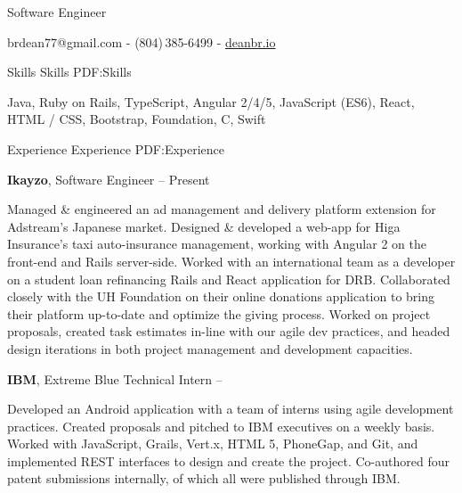 \documentclass[letterpaper,MMMyyyy,nonstopmode]{simpleresumecv}
\newcommand{\CVWebpage}{deanbr.io}
\begin{document}


\begin{SubTitle}
{Software Engineer}
\par
{brdean77@gmail.com}
-
(804)\,385-6499
-
{\url{\CVWebpage}}
\end{SubTitle}

\begin{Body}


\Section
{Skills}
{Skills}
{PDF:Skills}

\begin{large}
\Entry
Java,
Ruby on Rails,
TypeScript,
Angular 2/4/5,
JavaScript (ES6),
React,
HTML / CSS,
\Gap
Bootstrap,
Foundation,
C,
Swift
\end{large}



\BigGap
\Section
{Experience}
{Experience}
{PDF:Experience}

\Entry
\begin{large}
{\textbf{Ikayzo}},
Software Engineer
\hfill
{} --
Present

\Gap
\BulletItem
Managed \& engineered an ad management and delivery platform extension for Adstream's Japanese market.
\BulletItem
Designed \& developed a web-app for Higa Insurance's taxi auto-insurance management, working with Angular 2 on the front-end and Rails server-side.
\BulletItem
Worked with an international team as a developer on a student loan refinancing Rails and React application for DRB.
\BulletItem
Collaborated closely with the UH Foundation on their online donations application to bring their platform up-to-date and optimize the giving process.
\begingroup %
\BulletItem
Worked on project proposals, created task estimates in-line with our agile dev practices, and headed design iterations in both project management and development capacities.
\end{large}

\BigGap
\BigGap

\Entry
\begin{large}
{\textbf{IBM}},
Extreme Blue Technical Intern
\hfill
{} --

\Gap
\BulletItem
Developed an Android application with a team of interns using agile development practices.
\BulletItem
Created proposals and pitched to IBM executives on a weekly basis.
\BulletItem
Worked with JavaScript, Grails, Vert.x, HTML 5, PhoneGap, and Git, and implemented REST interfaces to design and create the project.
\begingroup %
\BulletItem
Co-authored four patent submissions internally, of which all were published through IBM.
\end{large}


\end{Body}
\end{document}
